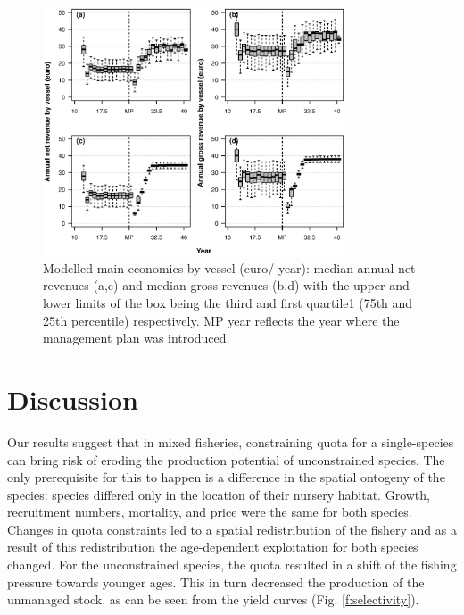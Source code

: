 \documentclass[12pt,oneline,a4paper,numbib]{ouparticle}
\numberwithin{equation}{subsection} %
\begin{document}
\begin{figure}[!ht]
\centering
\includegraphics[width=0.8\textwidth]{Figures/Mean_Economics.eps} 
\caption{Modelled main economics by vessel (euro/ year): median annual net revenues (a,c) and median gross revenues (b,d) with the upper and lower limits of the box being the third and first quartile1 (75th and 25th percentile) respectively. MP year reflects the year where the management plan was introduced.}
\label{f:meanecon}
\end{figure}

\section{Discussion}

Our results suggest that in mixed fisheries, constraining quota for a single-species can bring risk of eroding the production potential of unconstrained species. The only prerequisite for this to happen is a difference in the spatial ontogeny of the species: species differed only in the location of their nursery habitat. Growth, recruitment numbers, mortality, and price were the same for both species. Changes in quota constraints led to a spatial redistribution of the fishery and as a result of this redistribution the age-dependent exploitation for both species changed. For the unconstrained species, the quota resulted in a shift of the fishing pressure towards younger ages. This in turn decreased the production of the unmanaged stock, as can be seen from the yield curves (Fig. \ref{f:selectivity}). 
\end{document}
